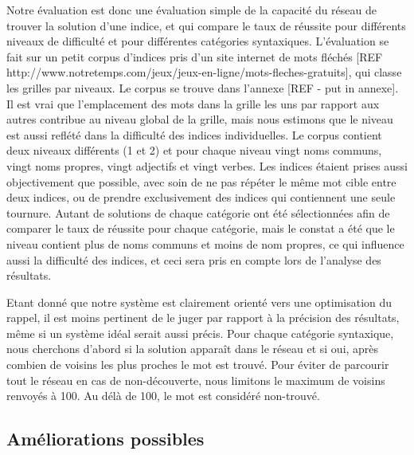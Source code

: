 Notre évaluation est donc une évaluation simple de la capacité du réseau de 
trouver la solution d'une indice, et qui compare le taux de réussite pour 
différents niveaux de difficulté et pour différentes catégories syntaxiques. 
L'évaluation se fait sur un petit corpus d'indices pris d'un site internet de 
mots fléchés [REF 
http://www.notretemps.com/jeux/jeux-en-ligne/mots-fleches-gratuits], qui classe 
les grilles par niveaux. Le corpus se trouve dans l'annexe [REF - put in 
annexe]. Il est vrai que l'emplacement des mots dans la grille les uns par 
rapport aux autres contribue au niveau global de la grille, mais nous estimons 
que le niveau est aussi reflété dans la difficulté des indices individuelles. Le 
corpus contient deux niveaux différents (1 et 2) et pour chaque niveau vingt 
noms communs, vingt noms propres, vingt adjectifs et vingt verbes. Les indices 
étaient prises aussi objectivement que possible, avec soin de ne pas répéter le 
même mot cible entre deux indices, ou de prendre exclusivement des indices qui 
contiennent une seule tournure. Autant de solutions de chaque catégorie ont été 
sélectionnées afin de comparer le taux de réussite pour chaque catégorie, mais 
le constat a été que le niveau contient plus de noms communs et moins de nom 
propres, ce qui influence aussi la difficulté des indices, et ceci sera pris en 
compte lors de l'analyse des résultats.

Etant donné que notre système est clairement orienté vers une optimisation du 
rappel, il est moins pertinent de le juger par rapport à la précision des 
résultats, même si un système idéal serait aussi précis. Pour chaque catégorie 
syntaxique, nous cherchons d'abord si la solution apparaît dans le réseau et si 
oui, après combien de voisins les plus proches le mot est trouvé. Pour éviter de 
parcourir tout le réseau en cas de non-découverte, nous limitons le maximum de 
voisins renvoyés à 100. Au délà de 100, le mot est considéré non-trouvé.





\subsection{Améliorations possibles}
